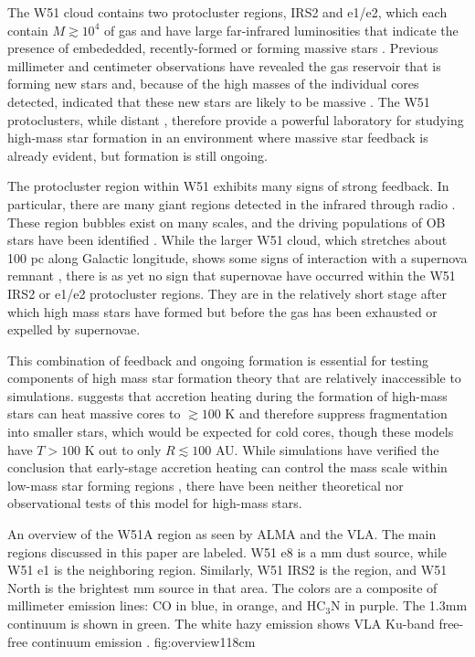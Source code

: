 \documentclass{aa}
\begin{document}
The W51 cloud contains two protocluster regions, IRS2 and e1/e2, which each
contain $M\gtrsim10^4$ \msun of gas and have large far-infrared luminosities
that
indicate the presence of embededded, recently-formed or forming massive stars
\citep{Harvey1986a,Sievers1991a,Ginsburg2012a,Ginsburg2016b}.  Previous
millimeter and centimeter observations have revealed the gas reservoir
that is forming new stars and, because of the high masses of the individual
cores detected, indicated that these new stars are likely to be massive
\citep{Zhang1997a,Eisner2002a,Zapata2009a,Tang2009a,
Zapata2010a,Shi2010b,Shi2010a,Koch2010a,Koch2012a,Koch2012b,Tang2012a,Goddi2016a}.  The
W51 protoclusters, while distant \citep[5.4 kpc;][]{Sato2010a}, therefore
provide a powerful laboratory for studying high-mass star formation in an
environment where massive star feedback is already evident, but 
formation is still ongoing.

The protocluster region within W51 exhibits many signs of strong feedback.  In
particular, there are many giant \hii regions detected in the infrared through
radio \citep{Mehringer1994a,Ginsburg2015a}.  These \hii region bubbles exist
on many scales, and the driving populations of OB stars have been identified
\citep{Kumar2004a,Ginsburg2016a}.  While the larger W51 cloud, which stretches
about 100 pc along Galactic longitude, shows some signs of interaction with a
supernova remnant \citep{Brogan2013a,Ginsburg2015a}, there is as yet no
sign that supernovae have occurred within the W51 IRS2 or e1/e2 protocluster
regions.  They are in the relatively short stage after which high mass stars
have formed but before the gas has been exhausted or expelled by supernovae.

This combination of feedback and ongoing formation is essential for testing
components of high mass star formation theory that are relatively inaccessible
to simulations.  \citet{Krumholz2006a} suggests that accretion heating during
the formation of high-mass stars can heat massive cores to $\gtrsim100$ K and
therefore suppress fragmentation into smaller stars, which would be expected
for cold cores, though these models have $T>100$ K out to only $R\lesssim100$
AU.  While simulations have verified the conclusion that early-stage accretion
heating can control the mass scale within low-mass star
forming regions \citep{Krumholz2007c,Offner2011b, Bate2012a,Bate2014b}, there
have been neither theoretical nor observational tests of this model for
high-mass stars. 

{An overview of the W51A region as seen by ALMA and the VLA.  The main regions
discussed in this paper are labeled.  W51 e8 is a mm dust source, while W51 e1
is the neighboring \hii region.  Similarly, W51 IRS2 is the \hii region, and
W51 North is the brightest mm source in that area.  The colors are a composite
of millimeter emission lines: CO in blue, \methanol in orange, and HC$_3$N in
purple.  The 1.3mm continuum is shown in green.  The white hazy emission
shows VLA Ku-band free-free continuum emission
\citep{Ginsburg2016b}.}
{fig:overview}{1}{18cm}
\end{document}
